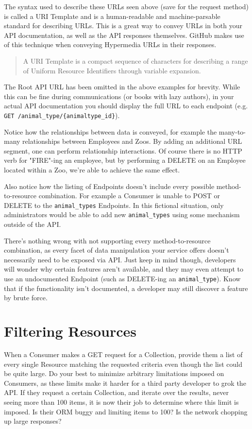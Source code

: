 \documentclass{book}
\begin{document}
The syntax used to describe these URLs seen above (save for the request method) is called a URI Template and is a human-readable and machine-parsable standard for describing URLs. This is a great way to convey URLs in both your API documentation, as well as the API responses themselves. GitHub makes use of this technique when conveying Hypermedia URLs in their responses.

\begin{quote}
A URI Template is a compact sequence of characters for describing a range of Uniform Resource Identifiers through variable expansion.\cite{RFC6570}
\end{quote}

The Root API URL has been omitted in the above examples for brevity. While this can be fine during communications (or books with lazy authors), in your actual API documentation you should display the full URL to each endpoint (e.g. \texttt{GET /animal\_type/\{animaltype\_id\}}).

Notice how the relationships between data is conveyed, for example the many-to-many relationships between Employees and Zoos. By adding an additional URL segment, one can perform relationship interactions. Of course there is no HTTP verb for "FIRE"-ing an employee, but by performing a DELETE on an Employee located within a Zoo, we're able to achieve the same effect.

Also notice how the listing of Endpoints doesn't include every possible method-to-resource combination. For example a Consumer is unable to POST or DELETE to the \texttt{animal\_types} Endpoints. In this fictional situation, only administrators would be able to add new \texttt{animal\_types} using some mechanism outside of the API.

There's nothing wrong with not supporting every method-to-resource combination, as every facet of data manipulation your service offers doesn't necessarily need to be exposed via API. Just keep in mind though, developers will wonder why certain features aren't available, and they may even attempt to use an undocumented Endpoint (such as DELETE-ing an \texttt{animal\_type}). Know that if the functionality isn't documented, a developer may still discover a feature by brute force.


\section{Filtering Resources}

When a Consumer makes a GET request for a Collection, provide them a list of every single Resource matching the requested criteria even though the list could be quite large. Do your best to minimize arbitrary limitations imposed on Consumers, as these limits make it harder for a third party developer to grok the API. If they request a certain Collection, and iterate over the results, never seeing more than 100 items, it is now their job to determine where this limit is imposed. Is their ORM buggy and limiting items to 100? Is the network chopping up large responses?
\end{document}
